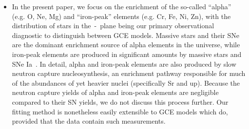 \documentclass[ms.tex]{subfiles}
\begin{document}
\begin{itemize}



	\item In the present paper, we focus on the enrichment of the so-called
	``alpha'' (e.g. O, Ne, Mg) and ``iron-peak'' elements (e.g. Cr, Fe,
	Ni, Zn), with the distribution of stars in the~\afe-\feh~plane being our
	primary observational diagnostic to distinguish between GCE models.
	Massive stars and their SNe are the dominant enrichment source of alpha
	elements in the universe, while iron-peak elements are produced in
	significant amounts by massive stars and SNe Ia~\citep[e.g.][]{Johnson2019}.
	In detail, alpha and iron-peak elements are also produced by slow neutron
	capture nucleosynthesis, an enrichment pathway responsible for much of the
	abundances of yet heavier nuclei (specifically Sr and up).
	Because the neutron capture yields of alpha and iron-peak elements are
	negligible compared to their SN yields, we do not discuss this process
	further.
	Our fitting method is nonetheless easily extensible to GCE models which do,
	provided that the data contain such measurements.


\end{itemize}
\end{document}
